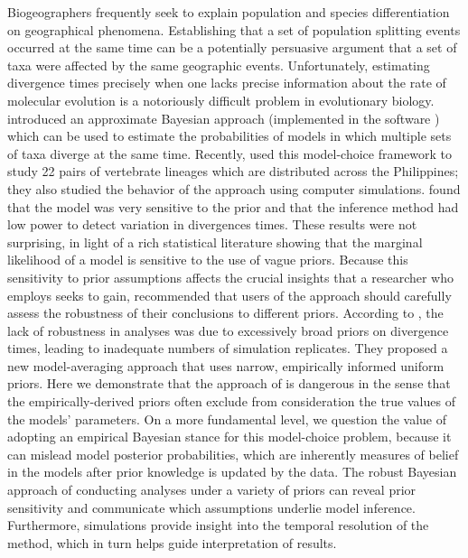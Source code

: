 Biogeographers frequently seek to explain population and species
differentiation on geographical phenomena.
Establishing that a set of population splitting events occurred
at the same time can be a potentially persuasive argument that a set of taxa
were affected by the same geographic events.
Unfortunately, estimating divergence times precisely when one lacks
precise information about the rate of molecular evolution is a notoriously
difficult problem in evolutionary biology.
\citet{Huang2011} introduced an approximate Bayesian approach (implemented
in the software \msb) which can be used to estimate the probabilities of
models in which multiple sets of taxa diverge at the same time. 
Recently, \citet{Oaks2012} used this model-choice framework to 
study 22 pairs of vertebrate lineages which are distributed across
the Philippines; they also studied the behavior of the \msb approach
using computer simulations.
\citet{Oaks2012} found that the model was very sensitive to the prior and
that the inference method had low power to detect variation in divergences
times.
These results were not surprising, in light of a rich statistical literature
showing that the marginal likelihood of a model is sensitive to the
use of vague priors.
Because this sensitivity to prior assumptions affects the crucial insights 
that a researcher who employs \msb seeks to gain, \citet{Oaks2012} recommended
that users of the approach should carefully assess the robustness of their 
conclusions to different priors.
According to \citet{Hickerson2013}, the lack of robustness in \msb analyses
was due to excessively broad priors on divergence times, leading to 
inadequate numbers of simulation replicates.
They proposed a new model-averaging approach that uses narrow, empirically
informed uniform priors.
Here we demonstrate that the approach of \citet{Hickerson2013} is
dangerous in the sense that the empirically-derived priors often
exclude from consideration the true values of the models' parameters.
On a more fundamental level, we question the value of adopting an empirical
Bayesian stance for this model-choice problem, because it can mislead model
posterior probabilities, which are inherently measures of belief in the
models after prior knowledge is updated by the data.
The robust Bayesian approach of conducting analyses under a variety
of priors can reveal prior sensitivity and communicate which assumptions
underlie model inference.
Furthermore, simulations provide insight into the temporal resolution of
the method, which in turn helps guide interpretation of results.
